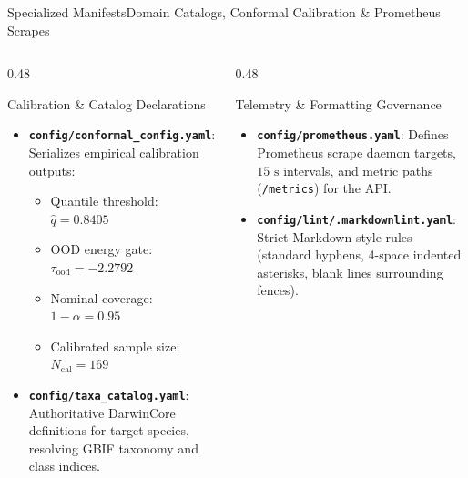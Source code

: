 \begin{frame}{Specialized Manifests}{Domain Catalogs, Conformal Calibration \& Prometheus Scrapes}
    \begin{columns}[T]
        \begin{column}{0.48\textwidth}
            \begin{block}{Calibration \& Catalog Declarations}
                \begin{itemize}\footnotesize
                    \item \textbf{\texttt{config/conformal\_config.yaml}}: Serializes empirical calibration outputs:
                        \begin{itemize}\scriptsize
                            \item Quantile threshold: $\hat{q} = 0.8405$
                            \item OOD energy gate: $\tau_{\text{ood}} = -2.2792$
                            \item Nominal coverage: $1 - \alpha = 0.95$
                            \item Calibrated sample size: $N_{\text{cal}} = 169$
                        \end{itemize}
                    \item \textbf{\texttt{config/taxa\_catalog.yaml}}: Authoritative DarwinCore definitions for target species, resolving GBIF taxonomy and class indices.
                \end{itemize}
            \end{block}
        \end{column}
        \begin{column}{0.48\textwidth}
            \begin{block}{Telemetry \& Formatting Governance}
                \begin{itemize}\footnotesize
                    \item \textbf{\texttt{config/prometheus.yaml}}: Defines Prometheus scrape daemon targets, $15\text{ s}$ intervals, and metric paths (\texttt{/metrics}) for the API.
                    \item \textbf{\texttt{config/lint/.markdownlint.yaml}}: Strict Markdown style rules (standard hyphens, 4-space indented asterisks, blank lines surrounding fences).
                \end{itemize}
            \end{block}
        \end{column}
    \end{columns}


\end{frame}
